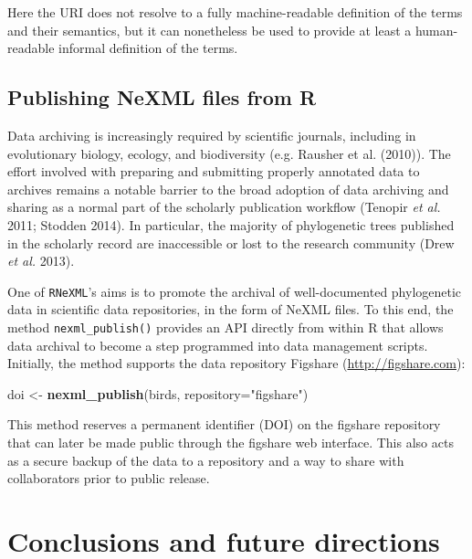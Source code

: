 \documentclass[author-year, review, 11pt]{components/elsarticle} %
\newenvironment{Shaded}{\begin{snugshade}}{\end{snugshade}}
\newcommand{\KeywordTok}[1]{\textcolor[rgb]{0.13,0.29,0.53}{\textbf{{#1}}}}
\newcommand{\DataTypeTok}[1]{\textcolor[rgb]{0.13,0.29,0.53}{{#1}}}
\newcommand{\StringTok}[1]{\textcolor[rgb]{0.31,0.60,0.02}{{#1}}}
\newcommand{\NormalTok}[1]{{#1}}
\begin{document}
Here the URI does not resolve to a fully machine-readable definition of
the terms and their semantics, but it can nonetheless be used to provide
at least a human-readable informal definition of the terms.

\subsection{Publishing NeXML files from
R}\label{publishing-nexml-files-from-r}

Data archiving is increasingly required by scientific journals,
including in evolutionary biology, ecology, and biodiversity (e.g.
Rausher et al. (2010)). The effort involved with preparing and
submitting properly annotated data to archives remains a notable barrier
to the broad adoption of data archiving and sharing as a normal part of
the scholarly publication workflow (Tenopir \emph{et al.} 2011; Stodden
2014). In particular, the majority of phylogenetic trees published in
the scholarly record are inaccessible or lost to the research community
(Drew \emph{et al.} 2013).

One of \texttt{RNeXML}'s aims is to promote the archival of
well-documented phylogenetic data in scientific data repositories, in
the form of NeXML files. To this end, the method
\texttt{nexml\_publish()} provides an API directly from within R that
allows data archival to become a step programmed into data management
scripts. Initially, the method supports the data repository Figshare
(\url{http://figshare.com}):

\begin{Shaded}
\begin{Highlighting}[]
\NormalTok{doi <-}\StringTok{ }\KeywordTok{nexml_publish}\NormalTok{(birds, }\DataTypeTok{repository=}\StringTok{"figshare"}\NormalTok{)}
\end{Highlighting}
\end{Shaded}

This method reserves a permanent identifier (DOI) on the figshare
repository that can later be made public through the figshare web
interface. This also acts as a secure backup of the data to a repository
and a way to share with collaborators prior to public release.

\section{Conclusions and future
directions}\label{conclusions-and-future-directions}
\end{document}

